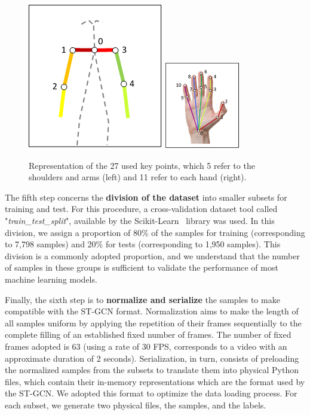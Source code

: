\begin{figure}[ht]
    \centering
    \includegraphics[width=3.5
    cm]{images/filtered_keypoints_body}
    \includegraphics[width=3.3cm]{images/filtered_keypoints_hand}
    \caption{Representation of the 27 used key points, which 5 refer to the shoulders and arms (left) and 11 refer to each hand (right).}
    \label{fig:filtered-keypoints}
\end{figure}


The fifth step concerns the \textbf{division of the dataset} into smaller subsets for training and test. For this procedure, a cross-validation dataset tool called "\textit{train\_test\_split}", available by the Scikit-Learn~\cite{scikit-learn} library was used. In this division, we assign a proportion of 80\% of the samples for training (corresponding to 7,798 samples) and 20\% for tests (corresponding to 1,950 samples). This division is a commonly adopted proportion, and we understand that the number of samples in these groups is sufficient to validate the performance of most machine learning models.

Finally, the sixth step is to \textbf{normalize and serialize} the samples to make compatible with the ST-GCN format. Normalization aims to make the length of all samples uniform by applying the repetition of their frames sequentially to the complete filling of an established fixed number of frames. The number of fixed frames adopted is 63 (using a rate of 30 FPS, corresponds to a video with an approximate duration of 2 seconds). Serialization, in turn, consists of preloading the normalized samples from the subsets to translate them into physical Python~\cite{python} files, which contain their in-memory representations which are the format used by the ST-GCN. We adopted this format to optimize the data loading process. For each subset, we generate two physical files, the samples, and the labels.

